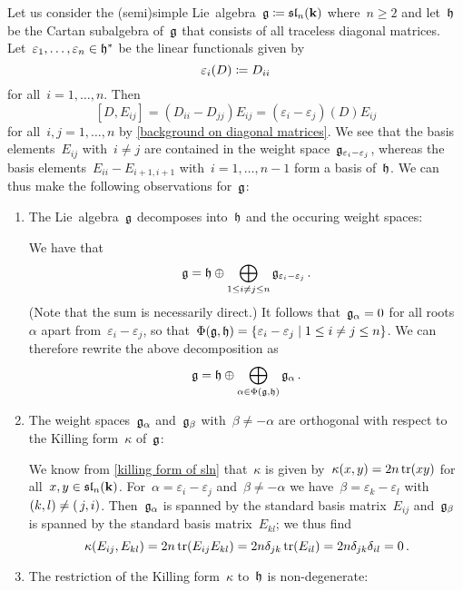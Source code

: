 \begin{example}
  \label{root space decomposition for sln}
  Let us consider the (semi)simple Lie~algebra~$\mathfrak{g} \coloneqq \mathfrak{sl}_n(\mathbf{k})$ where~$n \geq 2$ and let~$\mathfrak{h}$ be the Cartan subalgebra of~$\mathfrak{g}$ that consists of all traceless diagonal matrices.
  Let~$\varepsilon_1, \dotsc, \varepsilon_n \in \mathfrak{h}^*$ be the linear functionals given by
  \[
    \varepsilon_i(D)
    \coloneqq
    D_{ii}
  \]
  for all~$i = 1, \dotsc, n$.
  Then
  \[
    [D,E_{ij}]
    =
    (D_{ii} - D_{jj}) E_{ij}
    =
    (\varepsilon_i - \varepsilon_j)(D) E_{ij}
  \]
  for all~$i, j = 1, \dotsc, n$ by \cref{background on diagonal matrices}.
  We see that the basis elements~$E_{ij}$ with~$i \neq j$ are contained in the weight space~$\mathfrak{g}_{\varepsilon_i - \varepsilon_j}$, whereas the basis elements~$E_{ii} - E_{i+1,i+1}$ with~$i = 1, \dotsc, n-1$ form a basis of~$\mathfrak{h}$.
  We can thus make the following observations for~$\mathfrak{g}$:
  \begin{enumerate}
    \item
      The Lie~algebra~$\mathfrak{g}$ decomposes into~$\mathfrak{h}$ and the occuring weight spaces:
      
      We have that
      \[
        \mathfrak{g}
        =
        \mathfrak{h}
        \oplus
        \bigoplus_{1 \leq i \neq j \leq n}
        \mathfrak{g}_{\varepsilon_i - \varepsilon_j} \,.
      \]
      (Note that the sum is necessarily direct.)
      It follows that~$\mathfrak{g}_{\alpha} = 0$ for all roots~$\alpha$ apart from~$\varepsilon_i - \varepsilon_j$, so that~$\Phi(\glie, \hlie) = \{ \varepsilon_i - \varepsilon_j \suchthat 1 \leq i \neq j \leq n \}$.
      We can therefore rewrite the above decomposition as
      \[
        \mathfrak{g}
        =
        \mathfrak{h}
        \oplus
        \bigoplus_{\alpha \in \Phi(\mathfrak{g}, \mathfrak{h})}
        \mathfrak{g}_{\alpha}  \,.
      \]
    \item
      The weight spaces~$\mathfrak{g}_\alpha$ and~$\mathfrak{g}_\beta$ with~$\beta \neq -\alpha$ are orthogonal with respect to the Killing form~$\kappa$ of~$\mathfrak{g}$:
      
      We know from \cref{killing form of sln} that~$\kappa$ is given by~$\kappa(x,y) = 2n \operatorname{tr}(xy)$ for all~$x, y \in \mathfrak{sl}_n(\mathbf{k})$.
      For~$\alpha = \varepsilon_i - \varepsilon_j$ and~$\beta \neq - \alpha$ we have~$\beta = \varepsilon_k - \varepsilon_l$ with~$(k,l) \neq (\, j,i)$.
      Then~$\mathfrak{g}_\alpha$ is spanned by the standard basis matrix~$E_{ij}$ and~$\mathfrak{g}_\beta$ is spanned by the standard basis matrix~$E_{kl}$;
      we thus find
      \[
        \kappa(E_{ij}, E_{kl})
        =
        2n \operatorname{tr}(E_{ij} E_{kl})
        =
        2n \delta_{jk} \operatorname{tr}(E_{il})
        =
        2n \delta_{jk} \delta_{il}
        =
        0 \,.
      \]
    \item
      The restriction of the Killing form~$\kappa$ to~$\mathfrak{h}$ is non-degenerate:
      

\end{enumerate}
\end{example}
